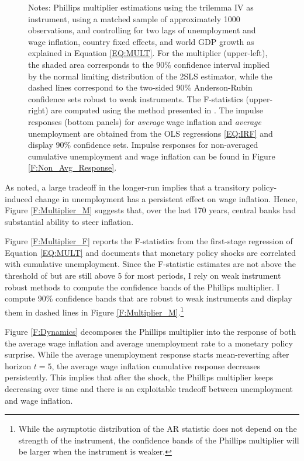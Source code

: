 \documentclass[12pt]{article}
\newcommand{\annote}[1]{\parbox{\textwidth}{\renewcommand{\baselinestretch}{1.0}\vspace{12pt} \footnotesize Notes: #1}}
\begin{document}
\begin{figure}[h!]
\begin{subfigure}[b]{0.9\textwidth}
		\end{subfigure}
		\annote{Phillips multiplier estimations using the trilemma IV as instrument, using a matched sample of approximately 1000 observations, and controlling for two lags of unemployment and wage inflation, country fixed effects, and world GDP growth as explained in Equation \eqref{EQ:MULT}. For the multiplier (upper-left), the shaded area corresponds to the 90\% confidence interval implied by the normal limiting distribution of the 2SLS estimator, while the dashed lines correspond to the two-sided 90\% Anderson-Rubin confidence sets robust to weak instruments. The F-statistics (upper-right) are computed using the method presented in \cite{Olea2013}. The impulse responses (bottom panels) for \textit{average} wage inflation and \textit{average} unemployment are obtained from the OLS regressions \eqref{EQ:IRF} and display 90\% confidence sets. Impulse responses for non-averaged cumulative unemployment and wage inflation can be found in Figure \ref{F:Non_Avg_Response}.}
	
\end{figure}

As \cite{Barnichon2019} noted, a large tradeoff in the longer-run implies that a transitory policy-induced change in unemployment has a persistent effect on wage inflation. Hence, Figure \ref{F:Multiplier_M} suggests that, over the last 170 years, central banks had substantial ability to steer inflation.

Figure \ref{F:Multiplier_F} reports the \cite{Olea2013} F-statistics from the first-stage regression of Equation \eqref{EQ:MULT} and documents that monetary policy shocks are correlated with cumulative unemployment. Since the F-statistic estimates are not above the threshold of \cite{Olea2013} but are still above 5 for most periods, I rely on weak instrument robust methods to compute the confidence bands of the Phillips multiplier. I compute 90\% \cite{Anderson1949} confidence bands that are robust to weak instruments and display them in dashed lines in Figure \ref{F:Multiplier_M}.\footnote{While the asymptotic distribution of the AR statistic does not depend on the strength of the instrument, the confidence bands of the Phillips multiplier will be larger when the instrument is weaker.}

Figure \ref{F:Dynamics} decomposes the Phillips multiplier into the response of both the average wage inflation and average unemployment rate to a monetary policy surprise. While the average unemployment response starts mean-reverting after horizon $t=5$, the average wage inflation cumulative response decreases persistently. This implies that after the shock, the Phillips multiplier keeps decreasing over time and there is an exploitable tradeoff between unemployment and wage inflation.
\end{document}
